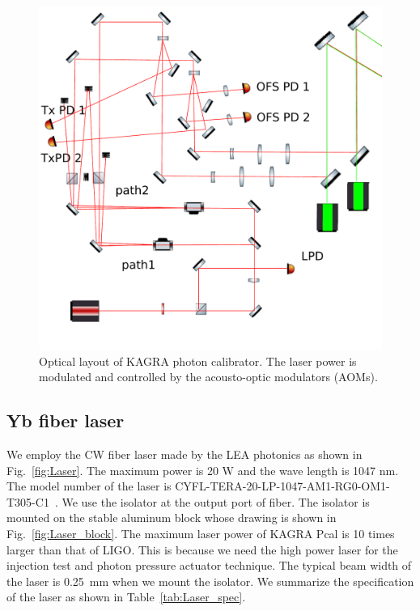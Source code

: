\begin{figure}
\begin{center}
\includegraphics[bb=0 0 592.440918 592.440918, width=15cm]{Figures/TxModuleXendNew0923.pdf}
\caption{Optical layout of KAGRA photon calibrator. The laser power is modulated and controlled by the acousto-optic modulators (AOMs).} 
\label{fig:Tx_module_layout} 
\end{center}
\end{figure}

\subsection{Yb fiber laser}
We employ the CW fiber laser made by the LEA photonics as shown in Fig.~\ref{fig:Laser}. The maximum power is 20 W and the wave length is 1047 nm. The model number of the laser is CYFL-TERA-20-LP-1047-AM1-RG0-OM1-T305-C1~\cite{Keopsys}. We use the isolator at the output port of fiber. The isolator is mounted on the stable aluminum block whose drawing is shown in Fig.~\ref{fig:Laser_block}. The maximum laser power of KAGRA Pcal is 10 times larger than that of LIGO. This is because we need the high power laser for the injection test and photon pressure actuator technique. The typical beam width of the laser is 0.25~mm when we mount the isolator. We summarize the specification of the laser as shown in Table~\ref{tab:Laser_spec}.

